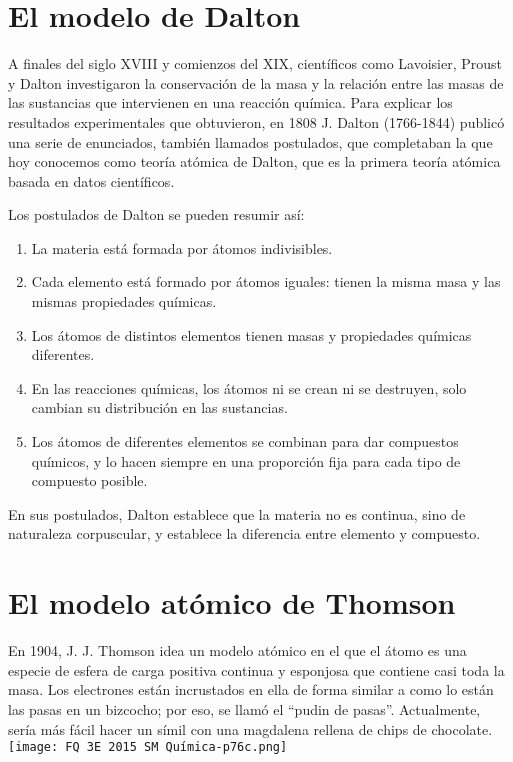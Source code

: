 \documentclass[
  spanish,
]{article}
\author{}
\date{}
\providecommand{\tightlist}{%
  \setlength{\itemsep}{0pt}\setlength{\parskip}{0pt}}
\begin{document}
\hypertarget{el-modelo-de-dalton}{%
\section{El modelo de Dalton}\label{el-modelo-de-dalton}}

A finales del siglo XVIII y comienzos del XIX, científicos como
Lavoisier, Proust y Dalton investigaron la conservación de la masa y la
relación entre las masas de las sustancias que intervienen en una
reacción química. Para explicar los resultados experimentales que
obtuvieron, en 1808 J. Dalton (1766-1844) publicó una serie de
enunciados, también llamados postulados, que completaban la que hoy
conocemos como teoría atómica de Dalton, que es la primera teoría
atómica basada en datos científicos.

Los postulados de Dalton se pueden resumir así:

\begin{enumerate}
\def\labelenumi{\arabic{enumi})}
\tightlist
\item
  La materia está formada por átomos indivisibles.
\item
  Cada elemento está formado por átomos iguales: tienen la misma masa y
  las mismas propiedades químicas.
\item
  Los átomos de distintos elementos tienen masas y propiedades químicas
  diferentes.
\item
  En las reacciones químicas, los átomos ni se crean ni se destruyen,
  solo cambian su distribución en las sustancias.
\item
  Los átomos de diferentes elementos se combinan para dar compuestos
  químicos, y lo hacen siempre en una proporción fija para cada tipo de
  compuesto posible.
\end{enumerate}

En sus postulados, Dalton establece que la materia no es continua, sino
de naturaleza corpuscular, y establece la diferencia entre elemento y
compuesto.

\hypertarget{el-modelo-atuxf3mico-de-thomson}{%
\section{El modelo atómico de
Thomson}\label{el-modelo-atuxf3mico-de-thomson}}

En 1904, J. J. Thomson idea un modelo atómico en el que el átomo es una
especie de esfera de carga positiva continua y esponjosa que contiene
casi toda la masa. Los electrones están incrustados en ella de forma
similar a como lo están las pasas en un bizcocho; por eso, se llamó el
``pudin de pasas''. Actualmente, sería más fácil hacer un símil con una
magdalena rellena de chips de chocolate.
\texttt{[image: FQ 3E 2015 SM Química-p76c.png]}
\end{document}
